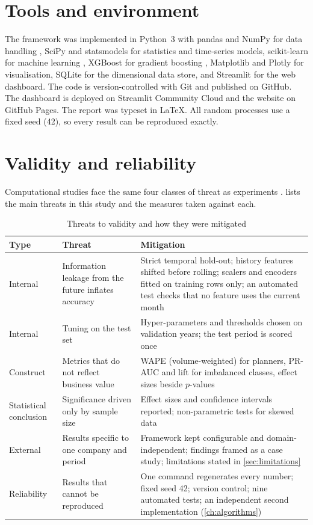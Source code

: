\section{Tools and environment}
The framework was implemented in Python~3 with pandas and NumPy for data handling \citep{mckinney2022},
SciPy and statsmodels for statistics and time-series models, scikit-learn for machine learning
\citep{pedregosa2011}, XGBoost for gradient boosting \citep{chen2016}, Matplotlib and Plotly for
visualisation, SQLite for the dimensional data store, and Streamlit for the web dashboard. The code is
version-controlled with Git and published on GitHub. The dashboard is deployed on Streamlit Community Cloud and
the website on GitHub Pages. The report was typeset in \LaTeX. All random processes use a fixed seed (42), so every result can be reproduced exactly.

\section{Validity and reliability}
Computational studies face the same four classes of threat as experiments \citep{shadish2002, wohlin2012}.
 lists the main threats in this study and the measures taken against each.

\begin{table}[htbp]\centering\small
\caption{Threats to validity and how they were mitigated}\label{tab:validity}
\begin{tabularx}{\linewidth}{@{}p{2.6cm}XX@{}}
\toprule
\textbf{Type} & \textbf{Threat} & \textbf{Mitigation} \\ \midrule
Internal & Information leakage from the future inflates accuracy & Strict temporal hold-out; history features shifted before rolling; scalers and encoders fitted on training rows only; an automated test checks that no feature uses the current month \\
Internal & Tuning on the test set & Hyper-parameters and thresholds chosen on validation years; the test period is scored once \\
Construct & Metrics that do not reflect business value & WAPE (volume-weighted) for planners, PR-AUC and lift for imbalanced classes, effect sizes beside $p$-values \\
Statistical conclusion & Significance driven only by sample size & Effect sizes and confidence intervals reported; non-parametric tests for skewed data \\
External & Results specific to one company and period & Framework kept configurable and domain-independent; findings framed as a case study; limitations stated in \cref{sec:limitations} \\
Reliability & Results that cannot be reproduced & One command regenerates every number; fixed seed 42; version control; nine automated tests; an independent second implementation (\cref{ch:algorithms}) \\ \bottomrule
\end{tabularx}
\end{table}


